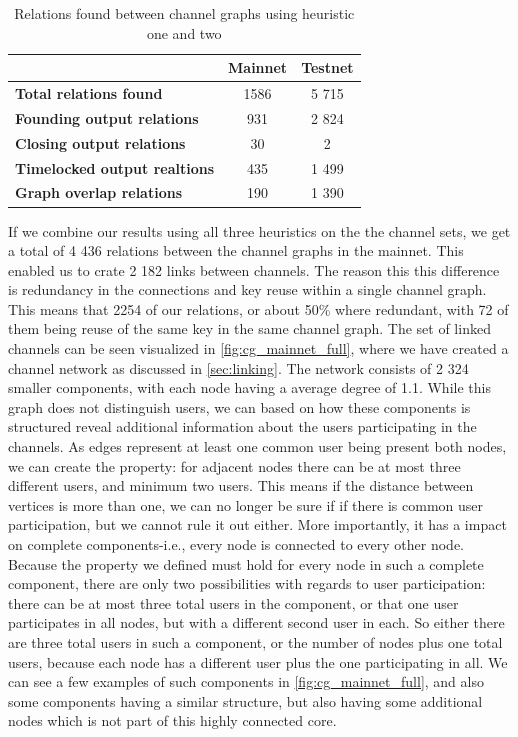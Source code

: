 \begin{table}[ht]
\centering
\caption{Relations found between channel graphs using heuristic one and two}
\label{table:connections}
\begin{tabular}{l|c|c}
                                        & \textbf{Mainnet} & \textbf{Testnet} \\ \hline
\textbf{Total relations found}       & 1586              & 5 715             \\ \hline
\textbf{Founding output relations}   & 931               & 2 824             \\ \hline
\textbf{Closing output relations}    & 30                & 2                \\ \hline
\textbf{Timelocked output realtions} & 435               & 1 499             \\ \hline
\textbf{Graph overlap relations}     & 190               & 1 390             \\ \hline
\end{tabular}
\end{table}

If we combine our results using all three heuristics on the the channel sets, we get a total of 4 436 relations between the channel graphs in the mainnet. This enabled us to crate 2 182 links between channels. The reason this this difference is redundancy in the connections and key reuse within a single channel graph. This means that 2254 of our relations, or about 50\% where redundant, with 72 of them being reuse of the same key in the same channel graph. The set of linked channels can be seen visualized in \cref{fig:cg_mainnet_full}, where we have created a channel network as discussed in \cref{sec:linking}. The network consists of 2 324 smaller components, with each node having a average degree of 1.1. While this graph does not distinguish users, we can based on how these components is structured reveal additional information about the users participating in the channels. 
As edges represent at least one common user being present both nodes, we can create the property: for adjacent nodes there can be at most three different users, and minimum two users. This means if the distance between vertices is more than one, we can no longer be sure if if there is common user participation, but we cannot rule it out either. More importantly, it has a impact on complete components-i.e., every node is connected to every other node. Because the property we defined must hold for every node in such a complete component, there are only two possibilities with regards to user participation: there can be at most three total users in the component, or that one user participates in all nodes, but with a different second user in each. 
So either there are three total users in such a component, or the number of nodes plus one total users, because each node has a different user plus the one participating in all.
We can see a few examples of such components in \cref{fig:cg_mainnet_full}, and also some components having a similar structure, but also having some additional nodes which is not part of this highly connected core.
\\


